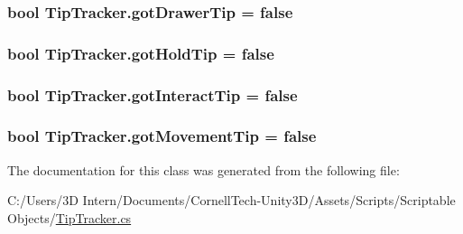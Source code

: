 \subsubsection[{\texorpdfstring{got\+Drawer\+Tip}{gotDrawerTip}}]{\setlength{\rightskip}{0pt plus 5cm}bool Tip\+Tracker.\+got\+Drawer\+Tip = false}\hypertarget{class_tip_tracker_afe4d422deeaad8d72b5401d0678ed980}{}\label{class_tip_tracker_afe4d422deeaad8d72b5401d0678ed980}
\subsubsection[{\texorpdfstring{got\+Hold\+Tip}{gotHoldTip}}]{\setlength{\rightskip}{0pt plus 5cm}bool Tip\+Tracker.\+got\+Hold\+Tip = false}\hypertarget{class_tip_tracker_ac7c6cb050656803b8a24a631a197c04e}{}\label{class_tip_tracker_ac7c6cb050656803b8a24a631a197c04e}
\subsubsection[{\texorpdfstring{got\+Interact\+Tip}{gotInteractTip}}]{\setlength{\rightskip}{0pt plus 5cm}bool Tip\+Tracker.\+got\+Interact\+Tip = false}\hypertarget{class_tip_tracker_a74e5351e2cb4af49943d3041a43ab83b}{}\label{class_tip_tracker_a74e5351e2cb4af49943d3041a43ab83b}
\subsubsection[{\texorpdfstring{got\+Movement\+Tip}{gotMovementTip}}]{\setlength{\rightskip}{0pt plus 5cm}bool Tip\+Tracker.\+got\+Movement\+Tip = false}\hypertarget{class_tip_tracker_abeb6841d90586f5dda37b7ad322c74dc}{}\label{class_tip_tracker_abeb6841d90586f5dda37b7ad322c74dc}


The documentation for this class was generated from the following file\+:\begin{DoxyCompactItemize}
\item 
C\+:/\+Users/3\+D Intern/\+Documents/\+Cornell\+Tech-\/\+Unity3\+D/\+Assets/\+Scripts/\+Scriptable Objects/\hyperlink{_tip_tracker_8cs}{Tip\+Tracker.\+cs}\end{DoxyCompactItemize}
